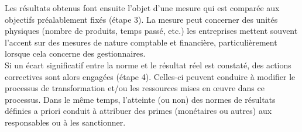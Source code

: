 \documentclass{kaobook}
\begin{document}
Les résultats obtenus font ensuite l’objet d’une mesure qui est comparée aux objectifs préalablement fixés (étape 3). La mesure peut concerner des unités physiques (nombre de produits, temps passé, etc.) les entreprises mettent souvent l’accent sur des mesures de nature comptable et financière, particulièrement lorsque cela concerne des gestionnaires.\\
Si un écart significatif entre la norme et le résultat réel est constaté, des actions correctives sont alors engagées (étape 4). Celles-ci peuvent conduire à modifier le processus de transformation et/ou les ressources mises en œuvre dans ce processus. Dans le même temps, l’atteinte (ou non) des normes de résultats définies a priori conduit à attribuer des primes (monétaires ou autres) aux responsables ou à les sanctionner.\\
\end{document}
